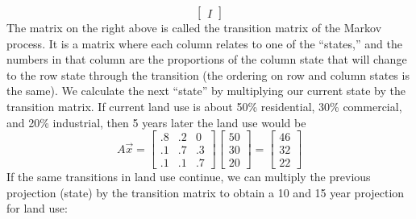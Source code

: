 \begin{example}
$$\begin{bmatrix}
I 
\end{bmatrix}
$$
The matrix on the right above is called the transition matrix of the Markov process. 
It is a matrix where each column relates to one of the ``states,'' and the numbers in that column are the proportions of the column state that will change to the row state through the transition (the ordering on row and column states is the same). 
We calculate the next ``state'' by multiplying our current state by the transition matrix. If current land use is about 50\% residential, 30\% commercial, and 20\% industrial, then 5 years later the land use would be 
$$ 
A\vec x= \begin {bmatrix} .8&.2&0\\.1&.7&.3\\.1&.1&.7 \end {bmatrix}
 \begin {bmatrix} 50\\30\\20 \end {bmatrix}
 =   \begin {bmatrix} 46\\ 32 \\ 22\end {bmatrix}
$$  If the same transitions in land use continue, we can multiply the previous projection (state) by the transition matrix to obtain a 10 and 15 year projection for land use:  
\begin{center}
\end{center}
\end{example}
